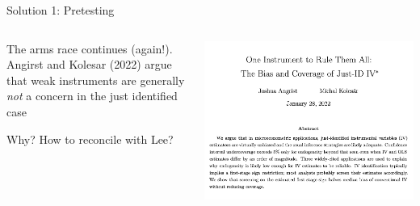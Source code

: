 \documentclass[notes,11pt, aspectratio=169]{beamer}
\newenvironment{wideitemize}{\itemize\addtolength{\itemsep}{10pt}}{\enditemize}
\begin{document}
\begin{frame}{Solution 1: Pretesting}
  \begin{columns}[T] %
    \begin{column}{0.5\textwidth}
      \begin{wideitemize}
      \item The arms race continues (again!). Angirst and Kolesar
        (2022) argue that weak instruments are generally \emph{not} a
        concern in the just identified case
      \item Why? How to reconcile with Lee?
      \end{wideitemize}
    \end{column}
    \begin{column}{0.5\textwidth}
      \includegraphics[width=\linewidth]{images/weakiv_kolesarangrist.png}
    \end{column}
  \end{columns}
\end{frame}
\end{document}
